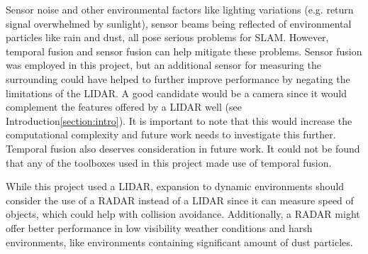 
Sensor noise and other environmental factors like lighting variations (e.g. return signal overwhelmed by sunlight), sensor beams being reflected of environmental particles like rain and dust, all pose serious problems for SLAM\:\cite{corke_robotics_2023}. However, temporal fusion and sensor fusion can help mitigate these problems\:\cite{siegwart_introduction_2011}.
Sensor fusion was employed in this project, but an additional sensor for measuring the surrounding could have helped to further improve performance by negating the limitations of the LIDAR. A good candidate would be a camera since it would complement the features offered by a LIDAR well (see Introduction\:\ref{section:intro})\:\cite{chen_slam_2022}. It is important to note that this would increase the computational complexity and future work needs to investigate this further\:\cite{chen_slam_2022}. 
Temporal fusion also deserves consideration in future work. It could not be found that any of the toolboxes used in this project made use of temporal fusion.

While this project used a LIDAR, expansion to dynamic environments should consider the use of a RADAR instead of a LIDAR since it can measure speed of objects\:\cite{ilas_electronic_2013}, which could help with collision avoidance. Additionally, a RADAR might offer better performance in low visibility weather conditions and harsh environments, like environments containing significant amount of dust particles\:\cite{fritsche_fusing_2018}.

